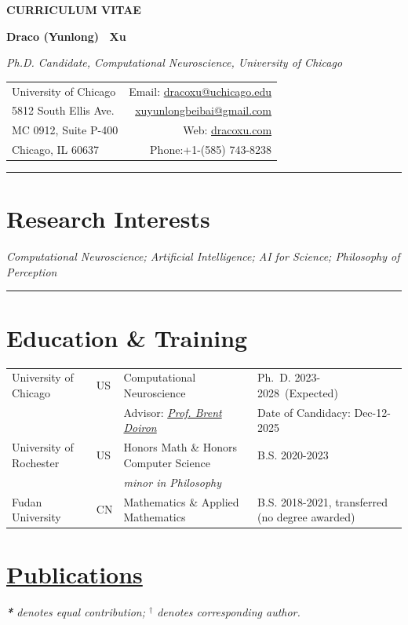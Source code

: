 \documentclass[10pt,letterpaper]{article}
\begin{document}
{\large\bfseries \uppercase{Curriculum Vitae}}\par\vspace{0.6em}
{\bfseries Draco (Yunlong) \ Xu}\par
{\itshape Ph.D. Candidate, Computational Neuroscience, University of Chicago}\par\vspace{0.4em}
\noindent
\begin{tabularx}{\textwidth}{@{}X r@{}}
University of Chicago & Email: \href{mailto:dracoxu@uchicago.edu}{dracoxu@uchicago.edu} \\
5812 South Ellis Ave. &  \href{mailto:xuyunlongbeibai@gmail.com}{xuyunlongbeibai@gmail.com} \\
MC 0912, Suite P-400 & Web: \href{https://dracoxu.com}{dracoxu.com} \\
Chicago, IL 60637 & Phone:+1-(585) 743-8238 \\
\end{tabularx}

\medskip\hrule\medskip

\section{Research Interests}
\textit{ Computational Neuroscience; Artificial Intelligence; AI for Science; Philosophy of Perception}
\\
\hrule

\section{Education \& Training}

\begin{tabular}{@{}l l l l@{}}
University of Chicago &US & Computational Neuroscience & Ph.~D. 2023-2028~(Expected)\\
& & Advisor: \textit{\href{https://brainmath.bsd.uchicago.edu/}{Prof. Brent Doiron}} &  Date of Candidacy: Dec-12-2025\\
University of Rochester  &US & Honors Math \& Honors Computer Science & B.S. 2020-2023 \\
& & \textit{minor in Philosophy} & \\
Fudan University & CN & Mathematics \& Applied Mathematics  & B.S. 2018-2021, transferred (no degree awarded)\\
\hline
\end{tabular}

\section{\href{https://scholar.google.com/citations?user=HHSvQskAAAAJ&hl=en}{Publications}}
{\emph{\textbf{*} denotes equal contribution; $^\dagger$ denotes corresponding author.}}
\end{document}
